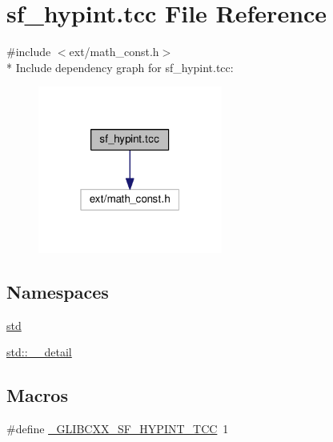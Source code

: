 \hypertarget{sf__hypint_8tcc}{}\section{sf\+\_\+hypint.\+tcc File Reference}
\label{sf__hypint_8tcc}
{\ttfamily \#include $<$ext/math\+\_\+const.\+h$>$}\\*
Include dependency graph for sf\+\_\+hypint.\+tcc\+:\nopagebreak
\begin{figure}[H]
\begin{center}
\leavevmode
\includegraphics[width=172pt]{sf__hypint_8tcc__incl}
\end{center}
\end{figure}
\subsection*{Namespaces}
\begin{DoxyCompactItemize}
\item 
 \hyperlink{namespacestd}{std}
\item 
 \hyperlink{namespacestd_1_1____detail}{std\+::\+\_\+\+\_\+detail}
\end{DoxyCompactItemize}
\subsection*{Macros}
\begin{DoxyCompactItemize}
\item 
\#define \hyperlink{sf__hypint_8tcc_acf643c2e2a7b3fab7ab4a8be18e29584}{\+\_\+\+G\+L\+I\+B\+C\+X\+X\+\_\+\+S\+F\+\_\+\+H\+Y\+P\+I\+N\+T\+\_\+\+T\+C\+C}~1
\end{DoxyCompactItemize}
